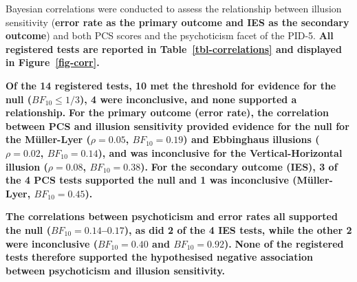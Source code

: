 \documentclass[
  man,
  floatsintext,
  longtable,
  nolmodern,
  notxfonts,
  notimes,
  colorlinks=true,linkcolor=blue,citecolor=blue,urlcolor=blue]{apa7}
\newcounter{none} %
\begin{document}
Bayesian correlations were conducted to assess the relationship between
illusion sensitivity (\textbf{error rate as the primary outcome and IES
as the secondary outcome}) and both PCS scores and the psychoticism
facet of the PID-5. \textbf{All registered tests are reported in
Table~\ref{tbl-correlations} and displayed in Figure~\ref{fig-corr}.}

\textbf{Of the 14 registered tests, 10 met the threshold for evidence
for the null (\(BF_{10} \leq 1/3\)), 4 were inconclusive, and none
supported a relationship.} \textbf{For the primary outcome (error rate),
the correlation between PCS and illusion sensitivity provided evidence
for the null for the Müller-Lyer (\(\rho = 0.05\), \(BF_{10} = 0.19\))
and Ebbinghaus illusions (\(\rho = 0.02\), \(BF_{10} = 0.14\)), and was
inconclusive for the Vertical-Horizontal illusion (\(\rho = 0.08\),
\(BF_{10} = 0.38\)).} \textbf{For the secondary outcome (IES), 3 of the
4 PCS tests supported the null and 1 was inconclusive (Müller-Lyer,
\(BF_{10} = 0.45\)).}

\textbf{The correlations between psychoticism and error rates all
supported the null (\(BF_{10} = 0.14\)--\(0.17\)), as did 2 of the 4 IES
tests, while the other 2 were inconclusive (\(BF_{10} = 0.40\) and
\(BF_{10} = 0.92\)).} \textbf{None of the registered tests therefore
supported the hypothesised negative association between psychoticism and
illusion sensitivity.}
\end{document}
